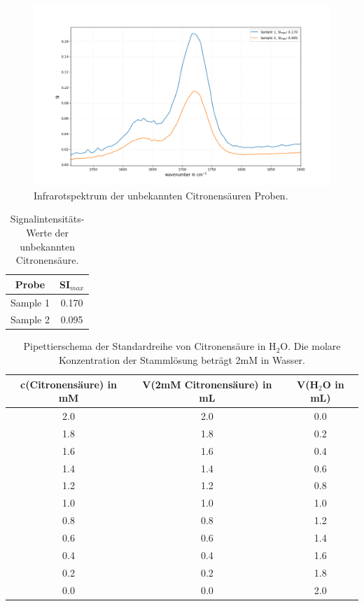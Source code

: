 \documentclass[10pt,a4paper]{article}
\begin{document}
			\begin{figure}[H]
				\centering
				\includegraphics[scale=0.55]{unknown_sample.png}
				\caption{Infrarotspektrum der unbekannten Citronensäuren Proben.}
				\label{fig:IR_unknown}
			\end{figure}
				
			\begin{table}[H]
			\centering
			\caption{Signalintensitäts-Werte der unbekannten Citronensäure.}
			\label{tab: SI_unknownsample}
				\begin{tabular}{cc}
						\toprule
						Probe & SI$_{max}$\\
						\midrule
						Sample 1 & 0.170\\
						Sample 2 & 0.095\\
						\bottomrule
				\end{tabular}
			\end{table}			
		
			\begin{table}[H]
				\centering
				\caption{Pipettierschema der Standardreihe von Citronensäure in H$_2$O. Die molare Konzentration der Stammlösung beträgt 2mM in Wasser.}
				\label{tab:pipettierschema Standardreihe}
				\begin{tabular}{ccc}
					\toprule
					c(Citronensäure) in mM &V(2mM Citronensäure) in mL & V(H$_2$O in mL)\\
					\midrule
					2.0 & 2.0 & 0.0\\
					1.8 & 1.8 & 0.2\\
					1.6 & 1.6 & 0.4 \\
					1.4 & 1.4 & 0.6 \\
					1.2 & 1.2 & 0.8\\
					1.0 & 1.0 & 1.0 \\
					0.8 & 0.8 & 1.2\\
					0.6 & 0.6 & 1.4\\
					0.4 & 0.4 & 1.6 \\
					0.2 & 0.2 & 1.8 \\
					0.0 & 0.0 & 2.0\\
					\bottomrule
				\end{tabular}
			\end{table}	
	
	
	\nocite{*}
	
	\newpage
	
	
\end{document}
